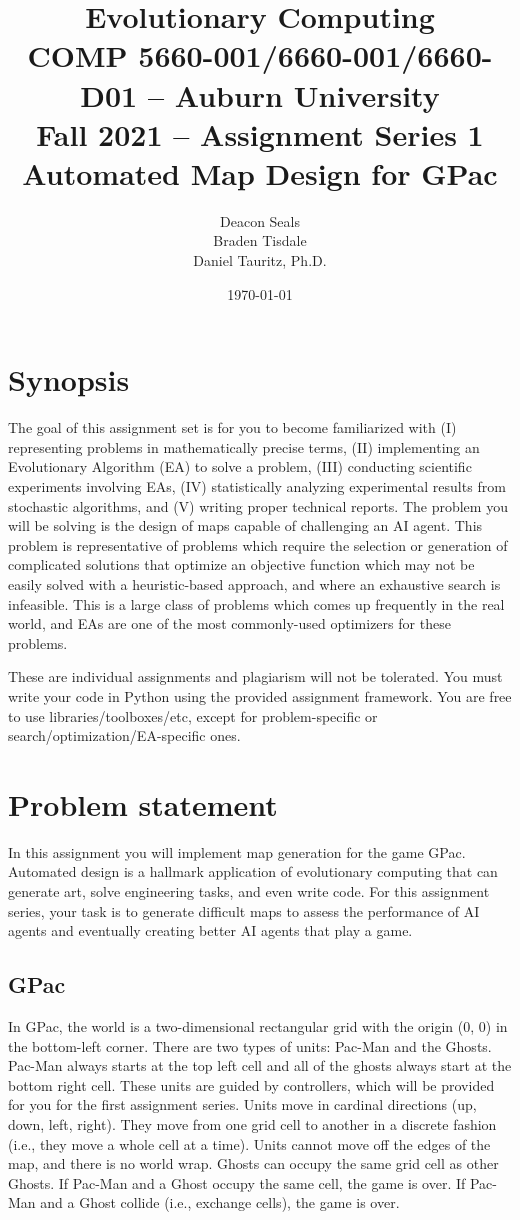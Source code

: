 \documentclass{article}
\title{Evolutionary Computing\\
        COMP 5660-001/6660-001/6660-D01 -- Auburn University\\
        Fall 2021 -- Assignment Series 1\\
        Automated Map Design for GPac}
\author{Deacon Seals\\
Braden Tisdale\\
Daniel Tauritz, Ph.D.}
\date{\today}
\newcommand\gamename{GPac}
\begin{document}
\maketitle

\section*{Synopsis}
The goal of this assignment set is for you to become familiarized with (I) representing problems in mathematically precise terms, (II) implementing an Evolutionary Algorithm (EA) to solve a problem, (III) conducting scientific experiments involving EAs, (IV) statistically analyzing experimental results from stochastic algorithms, and (V) writing proper technical reports. The problem you will be solving is the design of maps capable of challenging an AI agent. This problem is representative of problems which require the selection or generation of complicated solutions that optimize an objective function which may not be easily solved with a heuristic-based approach, and where an exhaustive search is infeasible. This is a large class of problems which comes up frequently in the real world, and EAs are one of the most commonly-used optimizers for these problems.

These are individual assignments and plagiarism will not be tolerated. You must write your code in Python using the provided assignment framework. You are free to use libraries/toolboxes/etc, except for problem-specific or search/optimization/EA-specific ones.

\section*{Problem statement}
In this assignment you will implement map generation for the game GPac. Automated design is a hallmark application of evolutionary computing that can generate art, solve engineering tasks, and even write code. For this assignment series, your task is to generate difficult maps to assess the performance of AI agents and eventually creating better AI agents that play a game.

\subsection*{\gamename{}}
In \gamename{}, the world is a two-dimensional rectangular grid with the origin (0, 0) in the bottom-left corner. There are two types of units: Pac-Man and the Ghosts. Pac-Man always starts at the top left cell and all of the ghosts always start at the bottom right cell. These units are guided by controllers, which will be provided for you for the first assignment series. Units move in cardinal directions (up, down, left, right). They move from one grid cell to another in a discrete fashion (i.e., they move a whole cell at a time). Units cannot move off the edges of the map, and there is no world wrap. Ghosts can occupy the same grid cell as other Ghosts. If Pac-Man and a Ghost occupy the same cell, the game is over. If Pac-Man and a Ghost collide (i.e., exchange cells), the game is over.
\end{document}
